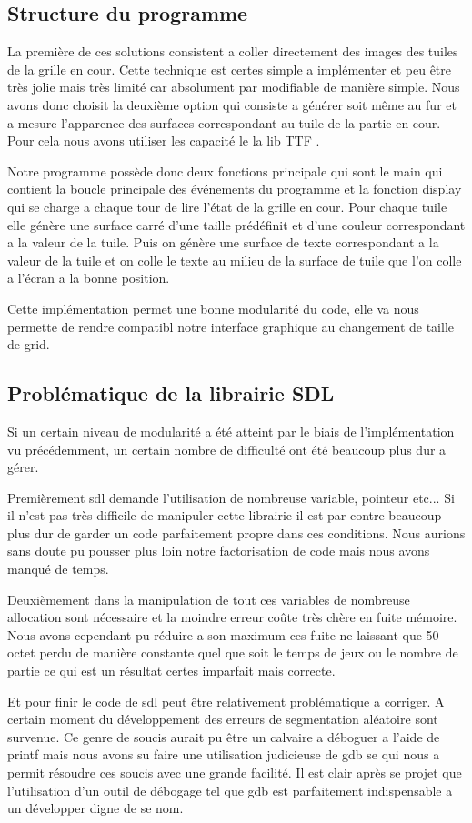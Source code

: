 \documentclass[12pt]{article}
\begin{document}
\subsection{Structure du programme}
La première de ces solutions consistent a coller directement des images des tuiles de la grille en cour.
Cette technique est certes simple a implémenter et peu être très jolie mais très limité
car absolument par modifiable de manière simple.
Nous avons donc choisit la deuxième option qui consiste a générer soit même au fur et a mesure
l'apparence des surfaces correspondant au tuile de la partie en cour. Pour cela nous avons utiliser
les capacité le la lib \og TTF \fg.
\par Notre programme possède donc deux fonctions principale qui sont le \og main \fg qui contient la boucle
principale des événements du programme et la fonction \og display \fg qui se charge a chaque tour de lire l'état
de la grille en cour. Pour chaque tuile elle génère une surface carré d'une taille prédéfinit et d'une couleur
correspondant a la valeur de la tuile. Puis on génère une surface de texte correspondant a la valeur de la tuile
et on colle le texte au milieu de la surface de tuile que l'on colle a l’écran a la bonne position.
\par Cette implémentation permet une bonne modularité du code, elle va nous permette de rendre compatibl
 notre interface graphique au changement de taille de grid.

\subsection {Problématique de la librairie SDL}
Si un certain niveau de modularité a été atteint par le biais de l’implémentation vu
précédemment, un certain nombre de difficulté ont été beaucoup plus dur a gérer.
\par Premièrement sdl demande l'utilisation de nombreuse variable, pointeur etc...
Si il n'est pas très difficile de manipuler cette librairie il est par contre beaucoup plus
dur de garder un code parfaitement propre dans ces conditions.
Nous aurions sans doute pu pousser plus loin notre factorisation de code mais nous
avons manqué de temps.
\par Deuxièmement dans la manipulation de tout ces variables de nombreuse allocation sont
nécessaire et la moindre erreur coûte très chère en fuite mémoire.
Nous avons cependant pu réduire a son maximum ces fuite ne laissant que 50 octet
perdu de manière constante quel que soit le temps de jeux ou le nombre de partie ce qui est
un résultat certes imparfait mais correcte.
\par Et pour finir le code de sdl peut être relativement problématique a corriger. A certain
moment du développement des erreurs de segmentation aléatoire sont survenue.
Ce genre de soucis aurait pu être un calvaire a déboguer a l'aide de printf mais
nous avons su faire une utilisation judicieuse de gdb se qui nous a permit résoudre
ces soucis avec une grande facilité. Il est clair après se projet que l'utilisation d'un outil de débogage
tel que gdb est parfaitement indispensable a un développer digne de se nom.
\end{document}
